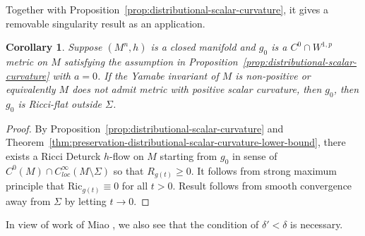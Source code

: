 \documentclass[12pt]{amsart}
\theoremstyle{plain}
\theoremstyle{plain}
\newtheorem{corollary}[subsection]{Corollary}
\theoremstyle{definition}
\theoremstyle{remark}
\numberwithin{equation}{subsection}
\newcommand{\hdel}{\tilde{\nabla}}
\begin{document}
%
%

Together with Proposition~\ref{prop:distributional-scalar-curvature}, it gives a removable singularity result as an application.

\begin{corollary}\label{thm:non-cpt-dist-scalar-curvature-lower-bdd}
Suppose $(M^n,h)$ is a closed manifold and $g_0$ is a $C^0\cap W^{1,p}$ metric on $M$ satisfying the assumption in Proposition~\ref{prop:distributional-scalar-curvature} with $a=0$. If the Yamabe invariant of $M$ is non-positive or equivalently $M$ does not admit metric with positive scalar curvature, then $g_0$, then $g_0$ is Ricci-flat outside $\Sigma$.
\end{corollary}
\begin{proof}
By Proposition~\ref{prop:distributional-scalar-curvature} and Theorem~\ref{thm:preservation-distributional-scalar-curvature-lower-bound}, there exists a Ricci Deturck $h$-flow on $M$ starting from $g_0$ in sense of  $C^0(M)\cap C^\infty_{loc}(M\setminus\Sigma)$ so that $R_{g(t)}\geq 0$.  It follows from strong maximum principle that $\mathrm{Ric}_{g(t)}\equiv 0$ for all $t>0$. Result follows from smooth convergence away from $\Sigma$ by letting $t\to0$.
\end{proof}
In view of work of Miao \cite{miao_positive_2003}, we also see that the condition of $\delta'<\delta$ is necessary.


\printbibliography[title=References]
\end{document}
